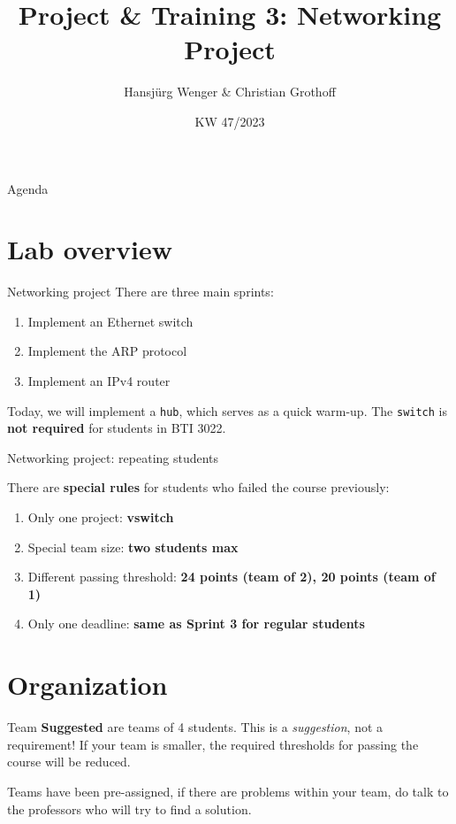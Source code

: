 \documentclass{beamer}
\title{Project \& Training 3: Networking Project}
\date{KW 47/2023}
\author{Hansj\"urg Wenger \& Christian Grothoff}
\institute{Berner Fachhochschule}
\begin{document}
\begin{frame}
  \maketitle
\end{frame}

\begin{frame}{Agenda}
\tableofcontents
\end{frame}

\section{Lab overview}

\begin{frame}{Networking project}
There are three main sprints:
\begin{enumerate}
\item Implement an Ethernet switch
\item Implement the ARP protocol
\item Implement an IPv4 router
\end{enumerate}
Today, we will implement a {\tt hub}, which serves as a quick warm-up.
The {\tt switch} is {\bf not required} for students in BTI 3022.
\end{frame}


\begin{frame}{Networking project: repeating students}

There are {\bf special rules} for students who failed the course previously:
\begin{enumerate}
\item Only one project: {\bf vswitch}
\item Special team size: {\bf two students max}
\item Different passing threshold: {\bf 24 points (team of 2), 20 points (team of 1)}
\item Only one deadline: {\bf same as Sprint 3 for regular students}
\end{enumerate}

\end{frame}


\section{Organization}
\begin{frame}{Team}
  {\bf Suggested} are teams of 4 students.
  This is a {\em suggestion}, not a requirement!
  If your team is smaller, the required thresholds for passing the
  course will be reduced.

  Teams have been pre-assigned, if there are problems
  within your team, do talk to the professors who will
  try to find a solution.
\end{frame}
\end{document}
